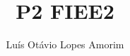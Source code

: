 \documentclass[a4paper, 12pt]{article}
\title{P2 FIEE2}
\author{Luís Otávio Lopes Amorim}
\begin{document}
\maketitle
\begin{enumerate}




\end{enumerate}
\end{document}

